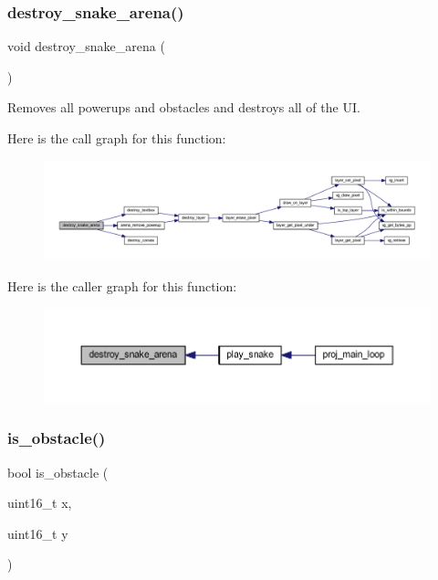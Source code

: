 \subsubsection{\texorpdfstring{destroy\+\_\+snake\+\_\+arena()}{destroy\_snake\_arena()}}
{\footnotesize\ttfamily void destroy\+\_\+snake\+\_\+arena (\begin{DoxyParamCaption}{ }\end{DoxyParamCaption})}



Removes all powerups and obstacles and destroys all of the UI. 

Here is the call graph for this function\+:\nopagebreak
\begin{figure}[H]
\begin{center}
\leavevmode
\includegraphics[width=350pt]{group__snake_ga66cce1d887c5e9e6cfb8e3d1f76ef9a9_cgraph}
\end{center}
\end{figure}
Here is the caller graph for this function\+:\nopagebreak
\begin{figure}[H]
\begin{center}
\leavevmode
\includegraphics[width=350pt]{group__snake_ga66cce1d887c5e9e6cfb8e3d1f76ef9a9_icgraph}
\end{center}
\end{figure}
\mbox{\label{group__snake_ga0ee9a6018bc0d0ac0ddbe22eec1e5452}} 
\subsubsection{\texorpdfstring{is\+\_\+obstacle()}{is\_obstacle()}}
{\footnotesize\ttfamily bool is\+\_\+obstacle (\begin{DoxyParamCaption}\item[{uint16\+\_\+t}]{x,  }\item[{uint16\+\_\+t}]{y }\end{DoxyParamCaption})}



